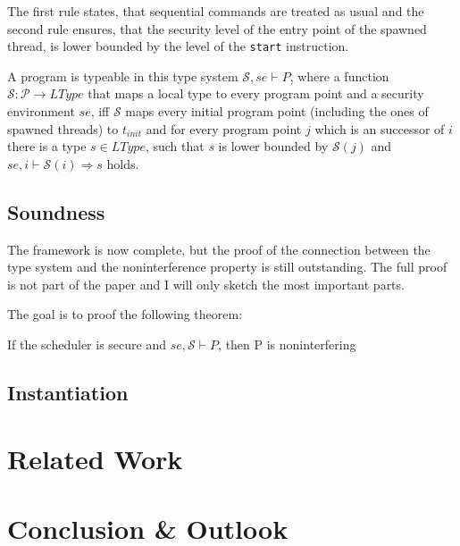 \documentclass[a4paper,10pt]{llncs}
\theoremstyle{definition}
\begin{document}
\begin{prooftree}
\end{prooftree}

The first rule states, that sequential commands are treated as usual
and the second rule ensures, that the security level of the entry point
of the spawned thread, is lower bounded by the level of the \texttt{start}
instruction.

A program is typeable in this type system $\mathcal{S}, se \vdash P$, where a function $\mathcal{S}:
\mathcal{P} \rightarrow LType$ that maps a local type to every program point
and a security environment $se$, iff $\mathcal{S}$ maps every initial program point
(including the ones of spawned threads) to $t_{init}$ and for every program point $j$ which is an
successor of $i$ there is a type $s \in LType$, such that $s$ is lower bounded
by $\mathcal{S}(j)$ and $se, i \vdash \mathcal{S}(i) \Rightarrow s$ holds.


\subsection{Soundness}
\label{sec:soundness}
The framework is now complete, but the proof of the connection between the
type system and the noninterference property is still outstanding. The full
proof is not part of the paper and I will only sketch the most important
parts.

The goal is to proof the following theorem:

\begin{theorem}
If the scheduler is secure and $se, \mathcal{S} \vdash P$, then P is noninterfering
\end{theorem}

\subsection{Instantiation}
\label{sec:instantiation}

\section{Related Work}
\label{sec:relatedwork}
\section{Conclusion \& Outlook}
\label{sec:conclusion}


\end{document}
